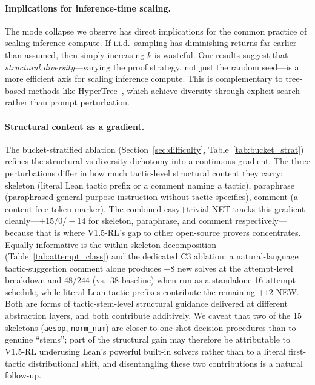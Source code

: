 \documentclass{article}
\begin{document}
\paragraph{Implications for inference-time scaling.}
The mode collapse we observe has direct implications for the common practice of scaling inference compute. If i.i.d.\ sampling has diminishing returns far earlier than assumed, then simply increasing $k$ is wasteful. Our results suggest that \emph{structural diversity}---varying the proof strategy, not just the random seed---is a more efficient axis for scaling inference compute. This is complementary to tree-based methods like HyperTree~\cite{lample2022hypertree}, which achieve diversity through explicit search rather than prompt perturbation.

\paragraph{Structural content as a gradient.}
The bucket-stratified ablation (Section~\ref{sec:difficulty}, Table~\ref{tab:bucket_strat}) refines the structural-vs-diversity dichotomy into a continuous gradient. The three perturbations differ in how much tactic-level structural content they carry: skeleton (literal Lean tactic prefix or a comment naming a tactic), paraphrase (paraphrased general-purpose instruction without tactic specifics), comment (a content-free token marker). The combined easy+trivial NET tracks this gradient cleanly---$+15 / 0 / -14$ for skeleton, paraphrase, and comment respectively---because that is where V1.5-RL's gap to other open-source provers concentrates. Equally informative is the within-skeleton decomposition (Table~\ref{tab:attempt_class}) and the dedicated C3 ablation: a natural-language tactic-suggestion comment alone produces $+8$ new solves at the attempt-level breakdown and $48/244$ (vs.\ $38$ baseline) when run as a standalone 16-attempt schedule, while literal Lean tactic prefixes contribute the remaining $+12$ NEW. Both are forms of tactic-stem-level structural guidance delivered at different abstraction layers, and both contribute additively. We caveat that two of the 15 skeletons (\texttt{aesop}, \texttt{norm\_num}) are closer to one-shot decision procedures than to genuine ``stems''; part of the structural gain may therefore be attributable to V1.5-RL underusing Lean's powerful built-in solvers rather than to a literal first-tactic distributional shift, and disentangling these two contributions is a natural follow-up.
\end{document}

